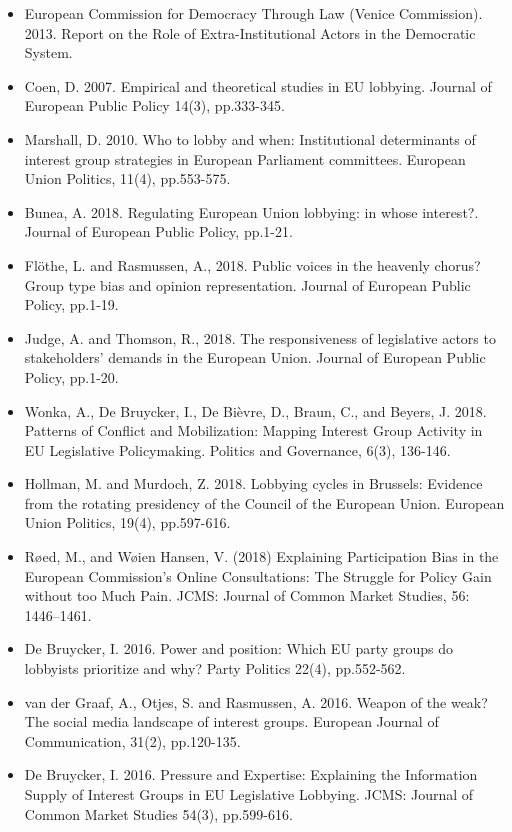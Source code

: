 \begin{itemize}
	\item European Commission for Democracy Through Law (Venice Commission). 2013. Report on the Role of Extra-Institutional Actors in the Democratic System.
	\item Coen, D. 2007. Empirical and theoretical studies in EU lobbying. Journal of European Public Policy 14(3), pp.333-345.
	\item Marshall, D. 2010. Who to lobby and when: Institutional determinants of interest group strategies in European Parliament committees. European Union Politics, 11(4), pp.553-575.
	\item Bunea, A. 2018. Regulating European Union lobbying: in whose interest?. Journal of European Public Policy, pp.1-21.
	\item Fl{\"o}the, L. and Rasmussen, A., 2018. Public voices in the heavenly chorus? Group type bias and opinion representation. Journal of European Public Policy, pp.1-19.
	\item Judge, A. and Thomson, R., 2018. The responsiveness of legislative actors to stakeholders’ demands in the European Union. Journal of European Public Policy, pp.1-20.
	\item Wonka, A., De Bruycker, I., De Bièvre, D., Braun, C., and Beyers, J. 2018. Patterns of Conflict and Mobilization: Mapping Interest Group Activity in EU Legislative Policymaking. Politics and Governance, 6(3), 136-146.
	\item Hollman, M. and Murdoch, Z. 2018. Lobbying cycles in Brussels: Evidence from the rotating presidency of the Council of the European Union. European Union Politics, 19(4), pp.597-616.
	\item R\o ed, M., and Wøien Hansen, V. (2018) Explaining Participation Bias in the European Commission's Online Consultations: The Struggle for Policy Gain without too Much Pain. JCMS: Journal of Common Market Studies, 56: 1446–1461.
	\item De Bruycker, I. 2016. Power and position: Which EU party groups do lobbyists prioritize and why? Party Politics 22(4), pp.552-562.
	\item van der Graaf, A., Otjes, S. and Rasmussen, A. 2016. Weapon of the weak? The social media landscape of interest groups. European Journal of Communication, 31(2), pp.120-135.
	\item De Bruycker, I. 2016. Pressure and Expertise: Explaining the Information Supply of Interest Groups in EU Legislative Lobbying. JCMS: Journal of Common Market Studies 54(3), pp.599-616.

\end{itemize}
